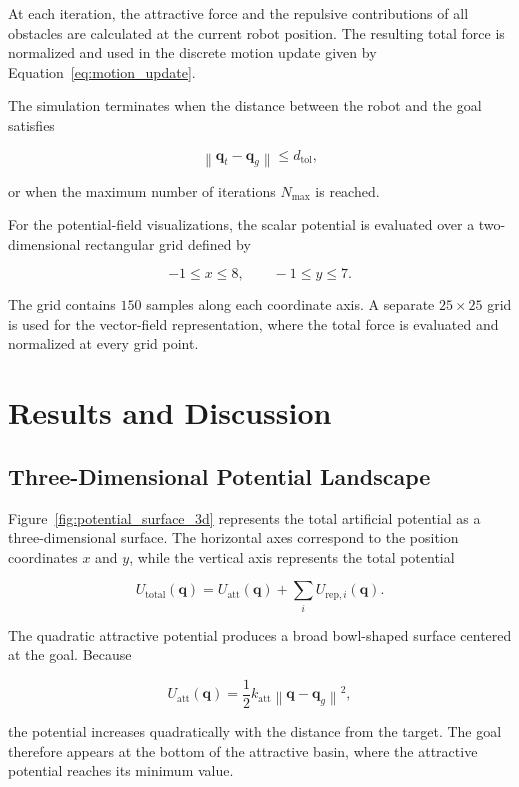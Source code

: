 \documentclass[10pt,twocolumn,a4paper]{article}
\begin{document}
At each iteration, the attractive force and the repulsive contributions
of all obstacles are calculated at the current robot position. The
resulting total force is normalized and used in the discrete motion
update given by Equation~\eqref{eq:motion_update}.

The simulation terminates when the distance between the robot and the
goal satisfies

\[
    \left\|
        \mathbf{q}_t-\mathbf{q}_g
    \right\|
    \leq
    d_{\mathrm{tol}},
\]

or when the maximum number of iterations $N_{\max}$ is reached.

For the potential-field visualizations, the scalar potential is evaluated
over a two-dimensional rectangular grid defined by

\[
    -1 \leq x \leq 8,
    \qquad
    -1 \leq y \leq 7.
\]

The grid contains $150$ samples along each coordinate axis. A separate
$25\times25$ grid is used for the vector-field representation, where
the total force is evaluated and normalized at every grid point.

\section{Results and Discussion}

\subsection{Three-Dimensional Potential Landscape}

Figure~\ref{fig:potential_surface_3d} represents the total artificial
potential as a three-dimensional surface. The horizontal axes correspond to
the position coordinates $x$ and $y$, while the vertical axis represents the
total potential

\[
    U_{\mathrm{total}}(\mathbf{q})
    =
    U_{\mathrm{att}}(\mathbf{q})
    +
    \sum_i U_{\mathrm{rep},i}(\mathbf{q}).
\]

The quadratic attractive potential produces a broad bowl-shaped surface
centered at the goal. Because

\[
    U_{\mathrm{att}}(\mathbf{q})
    =
    \frac{1}{2}
    k_{\mathrm{att}}
    \left\|
        \mathbf{q}-\mathbf{q}_g
    \right\|^2,
\]

the potential increases quadratically with the distance from the target.
The goal therefore appears at the bottom of the attractive basin, where the
attractive potential reaches its minimum value.
\end{document}
